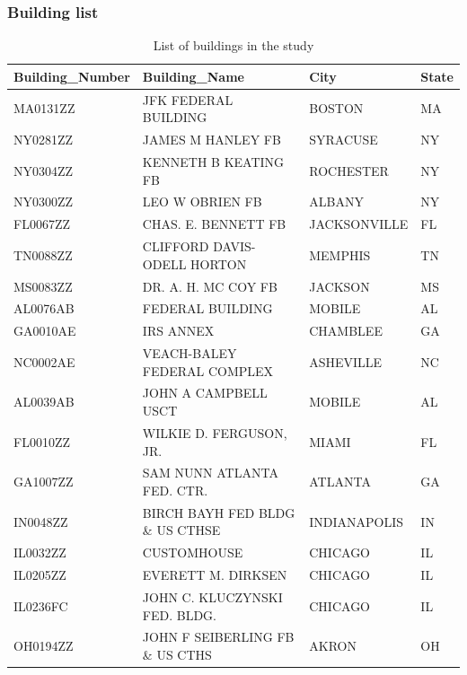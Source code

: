 \documentclass[12pt]{article}
\begin{document}
\subsubsection{Building list}
\begin{longtable}{llll}
\caption{List of buildings in the study}\\
\label{tab:building_list}
Building\_Number & Building\_Name                  & City           & State \\ \hline \hline \endhead
MA0131ZZ         & JFK FEDERAL BUILDING            & BOSTON         & MA    \\
NY0281ZZ         & JAMES M HANLEY FB               & SYRACUSE       & NY    \\
NY0304ZZ         & KENNETH B KEATING FB            & ROCHESTER      & NY    \\
NY0300ZZ         & LEO W OBRIEN FB                 & ALBANY         & NY    \\
FL0067ZZ         & CHAS. E. BENNETT FB             & JACKSONVILLE   & FL    \\
TN0088ZZ         & CLIFFORD DAVIS-ODELL HORTON     & MEMPHIS        & TN    \\
MS0083ZZ         & DR. A. H. MC COY FB             & JACKSON        & MS    \\
AL0076AB         & FEDERAL BUILDING                & MOBILE         & AL    \\
GA0010AE         & IRS ANNEX                       & CHAMBLEE       & GA    \\
NC0002AE         & VEACH-BALEY FEDERAL COMPLEX     & ASHEVILLE      & NC    \\
AL0039AB         & JOHN A CAMPBELL USCT            & MOBILE         & AL    \\
FL0010ZZ         & WILKIE D. FERGUSON, JR.         & MIAMI          & FL    \\
GA1007ZZ         & SAM NUNN ATLANTA FED. CTR.      & ATLANTA        & GA    \\
IN0048ZZ         & BIRCH BAYH FED BLDG \& US CTHSE & INDIANAPOLIS   & IN    \\
IL0032ZZ         & CUSTOMHOUSE                     & CHICAGO        & IL    \\
IL0205ZZ         & EVERETT M. DIRKSEN              & CHICAGO        & IL    \\
IL0236FC         & JOHN C. KLUCZYNSKI FED. BLDG.   & CHICAGO        & IL    \\
OH0194ZZ         & JOHN F SEIBERLING FB \& US CTHS & AKRON          & OH    \\

\end{longtable}
\end{document}
